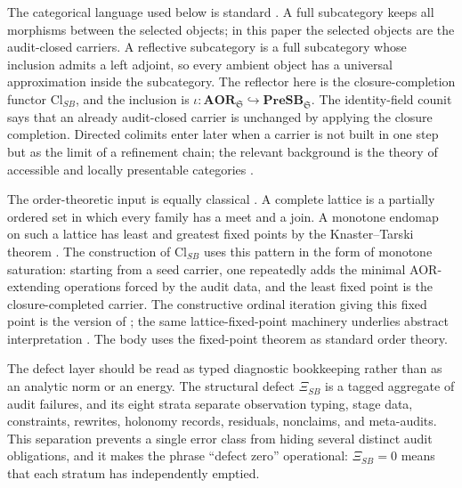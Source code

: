 \documentclass[11pt]{article}
\newcommand{\PreSB}{\mathbf{PreSB}}
\newcommand{\AOR}{\mathbf{AOR}}
\newcommand{\ClSB}{\mathrm{Cl}_{SB}}
\newcommand{\XiSB}{\Xi_{SB}}
\theoremstyle{definition}
\begin{document}
The categorical language used below is standard
\citep{MacLane1998Categories,Riehl2016CategoryTheory,Borceux1994CategoricalAlgebra}.
A full subcategory keeps all morphisms between the selected objects; in
this paper the selected objects are the audit-closed carriers.  A
reflective subcategory is a full subcategory whose inclusion admits a
left adjoint, so every ambient object has a universal approximation
inside the subcategory.  The reflector here is the closure-completion
functor \(\ClSB\), and the inclusion is
\(\iota:\AOR_{\mathfrak S}\hookrightarrow\PreSB_{\mathfrak S}\).  The
identity-field counit says that an already audit-closed carrier is
unchanged by applying the closure completion.  Directed colimits enter
later when a carrier is not built in one step but as the limit of a
refinement chain; the relevant background is the theory of accessible
and locally presentable categories \citep{AdamekRosicky1994LocallyPresentable}.

The order-theoretic input is equally classical
\citep{DaveyPriestley2002Lattices,GierzEtAl2003ContinuousLattices}.  A
complete lattice is a partially ordered set in which every family has a
meet and a join.  A monotone endomap on such a lattice has least and
greatest fixed points by the Knaster--Tarski theorem
\citep{Knaster1928SetFunctions,TarskiFixedPoint1955}.  The construction of
\(\ClSB\) uses this pattern in the form of monotone saturation:
starting from a seed carrier, one repeatedly adds the minimal
AOR-extending operations forced by the audit data, and the least fixed
point is the closure-completed carrier.  The constructive ordinal
iteration giving this fixed point is the version of
\citet{CousotCousotConstructive1979}; the same lattice-fixed-point
machinery underlies abstract interpretation
\citep{CousotCousot1977AbstractInterpretation}.  The body uses the
fixed-point theorem as standard order theory.

The defect layer should be read as typed diagnostic bookkeeping
rather than as an analytic norm or an energy.  The structural defect
\(\XiSB\) is a tagged aggregate of audit failures, and its eight
strata separate observation typing, stage data, constraints, rewrites,
holonomy records, residuals, nonclaims, and meta-audits.  This
separation prevents a single error class from hiding several distinct
audit obligations, and it makes the phrase ``defect zero'' operational:
\(\XiSB=0\) means that each stratum has independently emptied.
\end{document}
